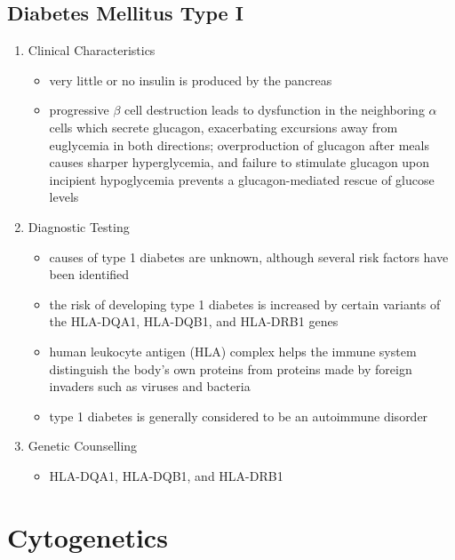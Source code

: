 \documentclass[12pt]{scrartcl}
\begin{document}
\subsection{Diabetes Mellitus Type I}
\label{sec:org4a0741c}
\begin{enumerate}
\item Clinical Characteristics
\label{sec:org49cece0}
\begin{itemize}
\item very little or no insulin is produced by the pancreas
\item progressive \(\beta\) cell destruction leads to dysfunction in the
neighboring \(\alpha\) cells which secrete glucagon, exacerbating
excursions away from euglycemia in both directions; overproduction
of glucagon after meals causes sharper hyperglycemia, and failure to
stimulate glucagon upon incipient hypoglycemia prevents a
glucagon-mediated rescue of glucose levels
\end{itemize}
\item Diagnostic Testing
\label{sec:org11cbed4}
\begin{itemize}
\item causes of type 1 diabetes are unknown, although several risk factors
have been identified
\item the risk of developing type 1 diabetes is increased by certain
variants of the HLA-DQA1, HLA-DQB1, and HLA-DRB1 genes
\item human leukocyte antigen (HLA) complex helps the immune system
distinguish the body's own proteins from proteins made by foreign
invaders such as viruses and bacteria
\item type 1 diabetes is generally considered to be an autoimmune
disorder
\end{itemize}

\item Genetic Counselling
\label{sec:org536b5af}
\begin{itemize}
\item HLA-DQA1, HLA-DQB1, and HLA-DRB1
\end{itemize}
\end{enumerate}

\section{Cytogenetics}
\label{sec:orgd288441}
\end{document}

